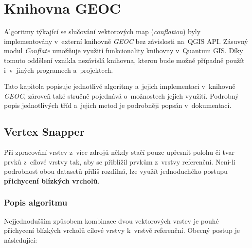 \chapter{Knihovna GEOC}
\label{5-geoc}


Algoritmy týkající se slučování vektorových map (\textit{conflation}) byly
implementovány v~externí knihovně \textit{GEOC} bez závislosti na~QGIS API. 
Zásuvný modul \textit{Conflate} umožňuje využití funkcionality knihovny 
v~Quantum GIS. Díky tomuto oddělení vznikla nezávislá knihovna, kterou bude
možné případně použít i~v~jiných programech a~projektech.

Tato kapitola popisuje jednotlivé algoritmy a~jejich implementaci v~knihovně
\textit{GEOC}, zároveň také stručně pojednává o~možnostech  jejich využití.
Podrobný popis jednotlivých tříd a~jejich metod je podrobněji popsán v~dokumentaci. %


\section{Vertex Snapper} 
\label{vertexsnapper}

Při zpracování vrstev z~více zdrojů někdy stačí pouze upřesnit polohu či tvar 
prvků z~cílové vrstvy tak, aby se přiblížil prvkům z~vrstvy referenční. 
\mbox{Není-li} podrobnost obou datasetů příliš rozdílná, lze využít jednoduchého 
postupu \textbf{přichycení blízkých vrcholů}.

\subsection{Popis algoritmu}
\label{vs-algoritmus}

Nejjednodušším způsobem kombinace dvou vektorových vrstev je pouhé přichycení 
blízkých vrcholů cílové vrstvy k~vrstvě referenční. Obecný postup je následující:


